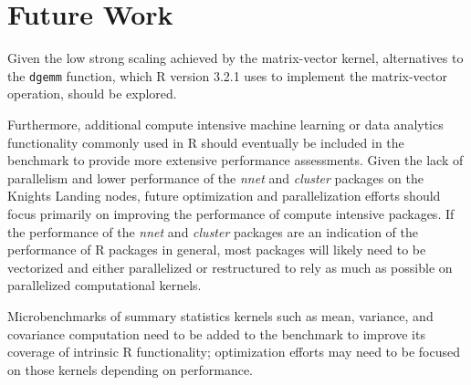\section{Future Work} \label{sec:future}
Given the low strong scaling achieved by the matrix-vector kernel, alternatives
  to the \texttt{dgemm} function, which R version 3.2.1 uses to implement the
  matrix-vector operation, should be explored.

Furthermore, additional compute intensive machine learning or data analytics
  functionality commonly used in R should eventually be included in the
  benchmark to provide more extensive performance assessments.
Given the lack of parallelism and lower performance of the \textit{nnet} and
  \textit{cluster} packages on the Knights Landing nodes, future optimization
  and parallelization efforts should focus primarily on improving the
  performance of compute intensive packages.
If the performance of the \textit{nnet} and \textit{cluster} packages are an
  indication of the performance of R packages in general, most packages will
  likely need to be vectorized and either parallelized or restructured to rely
  as much as possible on parallelized computational kernels.

Microbenchmarks of summary statistics kernels such as mean, variance, and
  covariance computation need to be added to the benchmark to improve its
  coverage of intrinsic R functionality; optimization efforts may need to be
  focused on those kernels depending on performance.

%




